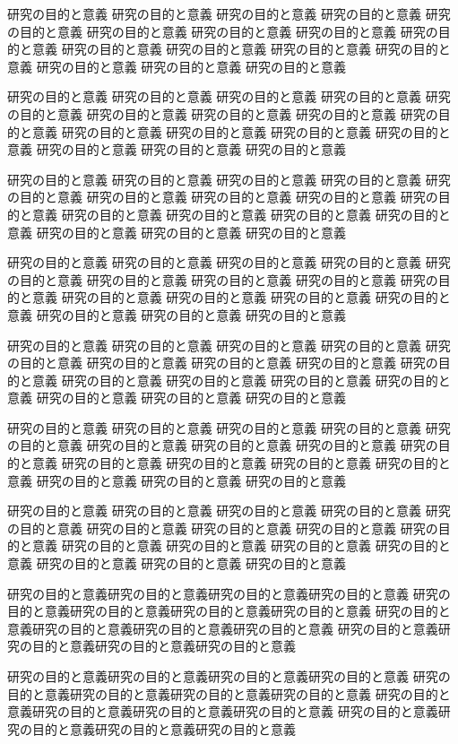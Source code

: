 \documentclass[12pt,dvipdfmx]{jarticle} %
\begin{document}
研究の目的と意義 研究の目的と意義 研究の目的と意義 研究の目的と意義 
研究の目的と意義 研究の目的と意義 研究の目的と意義 研究の目的と意義 
研究の目的と意義 研究の目的と意義 研究の目的と意義 研究の目的と意義 
研究の目的と意義 研究の目的と意義 研究の目的と意義 研究の目的と意義 

研究の目的と意義 研究の目的と意義 研究の目的と意義 研究の目的と意義 
研究の目的と意義 研究の目的と意義 研究の目的と意義 研究の目的と意義 
研究の目的と意義 研究の目的と意義 研究の目的と意義 研究の目的と意義 
研究の目的と意義 研究の目的と意義 研究の目的と意義 研究の目的と意義 

研究の目的と意義 研究の目的と意義 研究の目的と意義 研究の目的と意義 
研究の目的と意義 研究の目的と意義 研究の目的と意義 研究の目的と意義 
研究の目的と意義 研究の目的と意義 研究の目的と意義 研究の目的と意義 
研究の目的と意義 研究の目的と意義 研究の目的と意義 研究の目的と意義 

研究の目的と意義 研究の目的と意義 研究の目的と意義 研究の目的と意義 
研究の目的と意義 研究の目的と意義 研究の目的と意義 研究の目的と意義 
研究の目的と意義 研究の目的と意義 研究の目的と意義 研究の目的と意義 
研究の目的と意義 研究の目的と意義 研究の目的と意義 研究の目的と意義 

研究の目的と意義 研究の目的と意義 研究の目的と意義 研究の目的と意義 
研究の目的と意義 研究の目的と意義 研究の目的と意義 研究の目的と意義 
研究の目的と意義 研究の目的と意義 研究の目的と意義 研究の目的と意義 
研究の目的と意義 研究の目的と意義 研究の目的と意義 研究の目的と意義 

研究の目的と意義 研究の目的と意義 研究の目的と意義 研究の目的と意義 
研究の目的と意義 研究の目的と意義 研究の目的と意義 研究の目的と意義 
研究の目的と意義 研究の目的と意義 研究の目的と意義 研究の目的と意義 
研究の目的と意義 研究の目的と意義 研究の目的と意義 研究の目的と意義 

研究の目的と意義 研究の目的と意義 研究の目的と意義 研究の目的と意義 
研究の目的と意義 研究の目的と意義 研究の目的と意義 研究の目的と意義 
研究の目的と意義 研究の目的と意義 研究の目的と意義 研究の目的と意義 
研究の目的と意義 研究の目的と意義 研究の目的と意義 研究の目的と意義 

研究の目的と意義研究の目的と意義研究の目的と意義研究の目的と意義 
研究の目的と意義研究の目的と意義研究の目的と意義研究の目的と意義 
研究の目的と意義研究の目的と意義研究の目的と意義研究の目的と意義 
研究の目的と意義研究の目的と意義研究の目的と意義研究の目的と意義 

研究の目的と意義研究の目的と意義研究の目的と意義研究の目的と意義 
研究の目的と意義研究の目的と意義研究の目的と意義研究の目的と意義 
研究の目的と意義研究の目的と意義研究の目的と意義研究の目的と意義 
研究の目的と意義研究の目的と意義研究の目的と意義研究の目的と意義 
\end{document}
